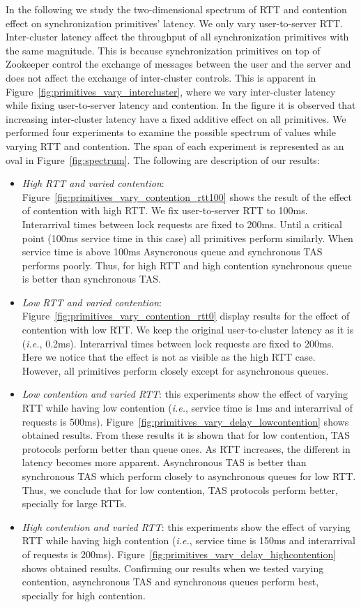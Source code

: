 In the following we study the two-dimensional spectrum of RTT and contention effect on synchronization primitives' latency. We only vary user-to-server RTT. Inter-cluster latency affect the throughput of all synchronization primitives with the same magnitude. This is because synchronization primitives on top of Zookeeper control the exchange of messages between the user and the server and does not affect the exchange of inter-cluster controls. This is apparent in Figure~\ref{fig:primitives_vary_intercluster}, where we vary inter-cluster latency while fixing user-to-server latency and contention. In the figure it is observed that increasing inter-cluster latency have a fixed additive effect on all primitives. We performed four experiments to examine the possible spectrum of values while varying RTT and contention. The span of each experiment is represented as an oval in Figure~\ref{fig:spectrum}. The following are description of our results:
\begin{itemize}
\item{\emph{High RTT and varied contention}: Figure~\ref{fig:primitives_vary_contention_rtt100} shows the result of the effect of contention with high RTT. We fix user-to-server RTT to 100ms. Interarrival times between lock requests are fixed to 200ms. Until a critical point (100ms service time in this case) all primitives perform similarly. When service time is above 100ms Asyncronous queue and synchronous TAS performs poorly. Thus, for high RTT and high contention synchronous queue is better than synchronous TAS.}
\item{\emph{Low RTT and varied contention}: Figure~\ref{fig:primitives_vary_contention_rtt0} display results for the effect of contention with low RTT. We keep the original user-to-cluster latency as it is (\emph{i.e.}, 0.2ms). Interarrival times between lock requests are fixed to 200ms. Here we notice that the effect is not as visible as the high RTT case. However, all primitives perform closely except for asynchronous queues.}
\item{\emph{Low contention and varied RTT}: this experiments show the effect of varying RTT while having low contention (\emph{i.e.}, service time is 1ms and interarrival of requests is 500ms). Figure~\ref{fig:primitives_vary_delay_lowcontention} shows obtained results. From these results it is shown that for low contention, TAS protocols perform better than queue ones. As RTT increases, the different in latency becomes more apparent. Asynchronous TAS is better than synchronous TAS which perform closely to asynchronous queues for low RTT. Thus, we conclude that for low contention, TAS protocols perform better, specially for large RTTs. }
\item{\emph{High contention and varied RTT}: this experiments show the effect of varying RTT while having high contention (\emph{i.e.}, service time is 150ms and interarrival of requests is 200ms). Figure~\ref{fig:primitives_vary_delay_highcontention} shows obtained results. Confirming our results when we tested varying contention, asynchronous TAS and synchronous queues perform best, specially for high contention.}
\end{itemize}

